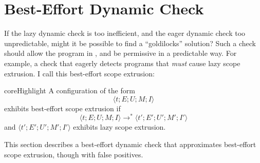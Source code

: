 \section{Best-Effort Dynamic Check}\label{section:best-effort-check}
If the lazy dynamic check is too inefficient, and the eager dynamic check too unpredictable, might it be possible to find a ``goldilocks'' solution? Such a check should allow the program in , and be permissive in a predictable way. For example, a check that eagerly detects programs that \textit{must} cause lazy scope extrusion. I call this best-effort scope extrusion:

\begin{definition}{coreHighlight} A \coreLang{} configuration of the form 
\[\langle t;E;U;M;I\rangle\]  
exhibits best-effort scope extrusion if 
\[ \langle t;E;U;M;I\rangle \to^{*} \langle t';E';U';M';I'\rangle\]
and $\langle t';E';U';M';I'\rangle$ exhibits lazy scope extrusion.
\end{definition}

This section describes a best-effort dynamic check that approximates best-effort scope extrusion, though with false positives. 

